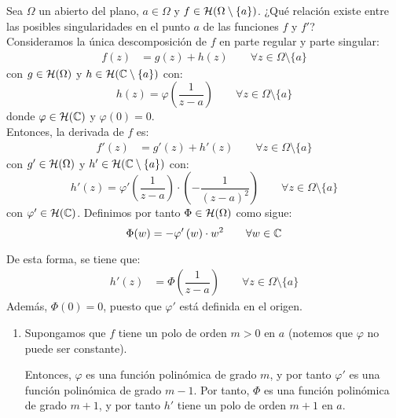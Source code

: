 \begin{ejercicio}
    Sea $\Omega$ un abierto del plano, $a \in \Omega$ y $f \in \mathcal{H}(\Omega \setminus \{a\})$. ¿Qué relación existe entre las posibles singularidades en el punto $a$ de las funciones $f$ y $f'$?\\

    Consideramos la única descomposición de $f$ en parte regular y parte singular:
    \begin{align*}
        f(z) &= g(z) + h(z)\qquad \forall z \in
        \Omega \setminus \{a\}
    \end{align*}
    con $g\in \mathcal{H}(\Omega)$ y $h \in \mathcal{H}(\mathbb{C} \setminus \{a\})$ con:
    \begin{equation*}
        h(z) = \varphi\left(\dfrac{1}{z - a}\right) \qquad \forall z \in \Omega \setminus \{a\}
    \end{equation*}
    donde $\varphi\in \mathcal{H}(\mathbb{C})$ y $\varphi(0) = 0$.\\

    Entonces, la derivada de $f$ es:
    \begin{align*}
        f'(z) &= g'(z) + h'(z) \qquad \forall z \in \Omega \setminus \{a\}
    \end{align*}
    con $g' \in \mathcal{H}(\Omega)$ y $h' \in \mathcal{H}(\mathbb{C} \setminus \{a\})$ con:
    \begin{equation*}
        h'(z) = \varphi'\left(\dfrac{1}{z - a}\right) \cdot \left(-\dfrac{1}{(z - a)^2}\right) \qquad \forall z \in \Omega \setminus \{a\}
    \end{equation*}
    con $\varphi' \in \mathcal{H}(\mathbb{C})$. Definimos por tanto $\Phi\in \mathcal{H}(\Omega)$ como sigue:
    \begin{equation*}
        \Phi(w) = -\varphi'\left(w\right) \cdot w^2 \qquad \forall w \in \mathbb{C}
    \end{equation*}

    De esta forma, se tiene que:
    \begin{align*}
        h'(z) &= \Phi\left(\dfrac{1}{z - a}\right) \qquad \forall z \in \Omega \setminus \{a\}
    \end{align*}
    Además, $\Phi(0) = 0$, puesto que $\varphi'$ está definida en el origen.
    \begin{enumerate}
        \item Supongamos que $f$ tiene un polo de orden $m > 0$ en $a$ (notemos que $\varphi$ no puede ser constante).
        
        Entonces, $\varphi$ es una función polinómica de grado $m$, y por tanto $\varphi'$ es una función polinómica de grado $m-1$. Por tanto, $\Phi$ es una función polinómica de grado $m+1$, y por tanto $h'$ tiene un polo de orden $m+1$ en $a$.


\end{enumerate}
\end{ejercicio}
